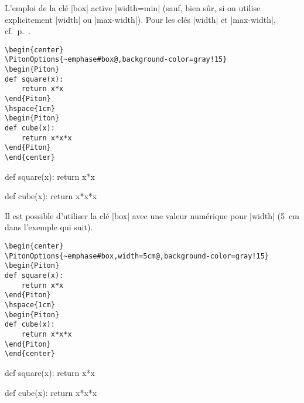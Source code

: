 \documentclass[dvipsnames,svgnames]{article}
\begin{document}
\smallskip
L'emploi de la clé |box| active |width=min| (sauf, bien sûr, si on utilise
explicitement |width| ou |max-width|). Pour les clés |width| et |max-width|,
cf.~p.~\pageref{width}.


\smallskip
\begin{Verbatim}
\begin{center}
\PitonOptions{~emphase#box@,background-color=gray!15}
\begin{Piton}
def square(x):
    return x*x
\end{Piton}
\hspace{1cm}
\begin{Piton}
def cube(x):
    return x*x*x
\end{Piton}
\end{center}
\end{Verbatim}

\begin{center}
\begin{Piton}
def square(x):
    return x*x
\end{Piton}
\hspace{1cm}
\begin{Piton}
def cube(x):
    return x*x*x
\end{Piton}
\end{center}

\vspace{1cm} Il est possible d'utiliser la clé |box| avec une valeur numérique pour |width|
(5~cm dans l'exemple qui suit).

\begin{Verbatim}
\begin{center}
\PitonOptions{~emphase#box,width=5cm@,background-color=gray!15}
\begin{Piton}
def square(x):
    return x*x
\end{Piton}
\hspace{1cm}
\begin{Piton}
def cube(x):
    return x*x*x
\end{Piton}
\end{center}
\end{Verbatim}

\begin{center}
\begin{Piton}
def square(x):
    return x*x
\end{Piton}
\hspace{1cm}
\begin{Piton}
def cube(x):
    return x*x*x
\end{Piton}
\end{center}
\end{document}
